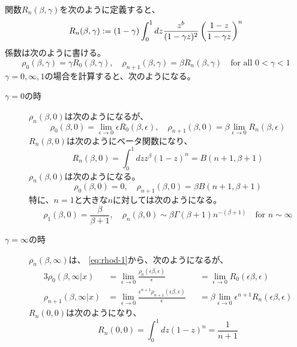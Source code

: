 関数$R_n(\beta,\gamma)$を次のように定義すると、
\begin{equation*}
	R_n(\beta,\gamma) := (1 - \gamma)\int_0^1dz\frac{z^b}
		{(1 - \gamma z)^2}\mathinner{\left({\frac{1 - z}{1 - \gamma z}}\right)}^n
\end{equation*}
係数は次のように書ける。
\begin{equation}\label{eq:rhod-taylor}
	\rho_0(\beta, \gamma) = \gamma R_0(\beta, \gamma)
	,\quad \rho_{n + 1}(\beta, \gamma) = \beta R_n(\beta, \gamma)
	\quad\text{for all } 0 < \gamma < 1
\end{equation}
$\gamma=0,\infty,1$の場合を計算すると、次のようになる。
\begin{description} %
	\item[$\gamma=0$の時] $\rho_n(\beta,0)$は次のようになるが、
	\begin{equation*}
		\rho_0(\beta,0) = \lim_{\epsilon\to0}\epsilon R_0(\beta,\epsilon)
		,\quad \rho_{n+1}(\beta,0) = \beta\lim_{\epsilon\to0}R_n(\beta,\epsilon)
	\end{equation*}
	$R_n(\beta,0)$は次のようにベータ関数になり、
	\begin{equation*}
		R_n(\beta,0) = \int_0^1dzz^\beta(1 - z)^n = B(n + 1, \beta + 1)
	\end{equation*}
	$\rho_n(\beta,0)$は次のようになる。
	\begin{equation*}
		\rho_0(\beta,0) = 0
		,\quad \rho_{n+1}(\beta,0) = \beta B(n + 1, \beta + 1)
	\end{equation*}
	特に、$n=1$と大きな$n$に対しては次のようになる。
	\begin{equation*}
		\rho_1(\beta,0) = \frac{\beta}{\beta + 1}
		,\quad \rho_n(\beta,0) \sim \beta\Gamma(\beta + 1)n^{- (\beta + 1)}
		\quad\text{for } n\sim \infty
	\end{equation*}
	\item[$\gamma=\infty$の時] $\rho_n(\beta,\infty)$は、
	\eqref{eq:rhod-1}から、次のようになるが、
	\begin{alignat*}{3}
		\rho_0(\beta,\infty|x)
		&= \lim_{\epsilon\to0}\frac{\rho_0(\epsilon\beta,\epsilon)}{\epsilon}
		&&= \lim_{\epsilon\to0}R_0(\epsilon\beta,\epsilon) \\
		\rho_{n+1}(\beta,\infty|x)
		&= \lim_{\epsilon\to0}\frac{\epsilon^{n+1}\rho_{n+1}(\epsilon\beta,\epsilon)}{\epsilon}
		&&= \beta\lim_{\epsilon\to0}\epsilon^{n+1}R_n(\epsilon\beta,\epsilon)
	\end{alignat*}
	$R_n(0,0)$は次のようになり、
	\begin{equation*}
		R_n(0,0) = \int_0^1dz(1 - z)^n = \frac{1}{n + 1}

\end{equation*}
\end{description}
